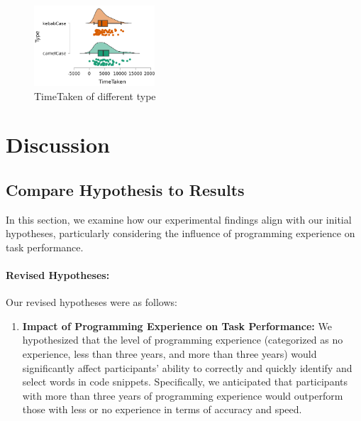 \documentclass{article}
\begin{document}
\begin{figure}[H]
    \centering
    \includegraphics[width=0.4\textwidth]{difference_type_statistics.png}
    \caption{TimeTaken of different type}
\end{figure}

\section{Discussion}
\subsection{Compare Hypothesis to Results}



\label{subsec:compare_hypothesis_results}

In this section, we examine how our experimental findings align with our initial hypotheses, particularly considering the influence of programming experience on task performance.

\paragraph{Revised Hypotheses:}
Our revised hypotheses were as follows:
\begin{enumerate}
    \item \textbf{Impact of Programming Experience on Task Performance:} We hypothesized that the level of programming experience (categorized as no experience, less than three years, and more than three years) would significantly affect participants' ability to correctly and quickly identify and select words in code snippets. Specifically, we anticipated that participants with more than three years of programming experience would outperform those with less or no experience in terms of accuracy and speed.
\end{enumerate}
\end{document}
